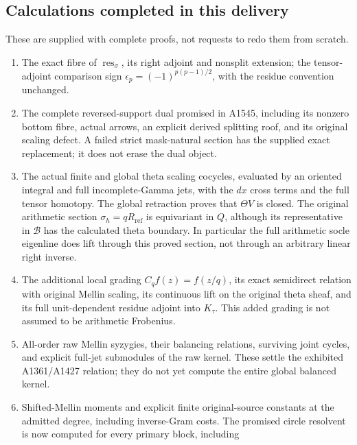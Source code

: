 \subsection{Calculations completed in this
delivery}\label{TranscriptLedgerStage:calculations-completed-in-this-delivery}

These are supplied with complete proofs, not requests to redo them from
scratch.

\begin{enumerate}
\def\labelenumi{\arabic{enumi}.}
\tightlist
\item
  The exact fibre of \(\operatorname{res}_\sigma\), its right adjoint
  and nonsplit extension; the tensor-adjoint comparison sign
  \(\epsilon_p=(-1)^{p(p-1)/2}\), with the residue convention unchanged.
\item
  The complete reversed-support dual promised in A1545, including its
  nonzero bottom fibre, actual arrows, an explicit derived splitting
  roof, and its original scaling defect. A failed strict mask-natural
  section has the supplied exact replacement; it does not erase the dual
  object.
\item
  The actual finite and global theta scaling cocycles, evaluated by an
  oriented integral and full incomplete-Gamma jets, with the \(dx\)
  cross terms and the full tensor homotopy. The global retraction proves
  that \(\Theta V\) is closed. The original arithmetic section
  \(\sigma_h=qR_{\mathrm{ref}}\) is equivariant in \(Q\), although its
  representative in \(\mathscr B\) has the calculated theta boundary. In
  particular the full arithmetic socle eigenline does lift through this
  proved section, not through an arbitrary linear right inverse.
\item
  The additional local grading \(C_qf(z)=f(z/q)\), its exact semidirect
  relation with original Mellin scaling, its continuous lift on the
  original theta sheaf, and its full unit-dependent residue adjoint into
  \(K_\tau\). This added grading is not assumed to be arithmetic
  Frobenius.
\item
  All-order raw Mellin syzygies, their balancing relations, surviving
  joint cycles, and explicit full-jet submodules of the raw kernel.
  These settle the exhibited A1361/A1427 relation; they do not yet
  compute the entire global balanced kernel.
\item
  Shifted-Mellin moments and explicit finite original-source constants
  at the admitted degree, including inverse-Gram costs. The promised
  circle resolvent is now computed for every primary block, including

\end{enumerate}
